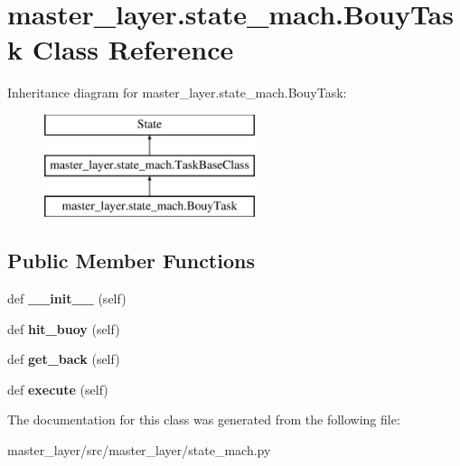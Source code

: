 \hypertarget{classmaster__layer_1_1state__mach_1_1BouyTask}{}\section{master\+\_\+layer.\+state\+\_\+mach.\+Bouy\+Task Class Reference}
\label{classmaster__layer_1_1state__mach_1_1BouyTask}
Inheritance diagram for master\+\_\+layer.\+state\+\_\+mach.\+Bouy\+Task\+:\begin{figure}[H]
\begin{center}
\leavevmode
\includegraphics[height=3.000000cm]{classmaster__layer_1_1state__mach_1_1BouyTask}
\end{center}
\end{figure}
\subsection*{Public Member Functions}
\begin{DoxyCompactItemize}
\item 
\mbox{\label{classmaster__layer_1_1state__mach_1_1BouyTask_a7ddfda8c598ac1e21a7c4649069fe4e5}} 
def {\bfseries \+\_\+\+\_\+init\+\_\+\+\_\+} (self)
\item 
\mbox{\label{classmaster__layer_1_1state__mach_1_1BouyTask_a45dad7f836ef16473a903f3ffc7c3b78}} 
def {\bfseries hit\+\_\+buoy} (self)
\item 
\mbox{\label{classmaster__layer_1_1state__mach_1_1BouyTask_a3b587fc85248bf49f6ebee0dd1643025}} 
def {\bfseries get\+\_\+back} (self)
\item 
\mbox{\label{classmaster__layer_1_1state__mach_1_1BouyTask_a94dd3606491b6e86a60fa2ec02e6a295}} 
def {\bfseries execute} (self)
\end{DoxyCompactItemize}


The documentation for this class was generated from the following file\+:\begin{DoxyCompactItemize}
\item 
master\+\_\+layer/src/master\+\_\+layer/state\+\_\+mach.\+py\end{DoxyCompactItemize}
